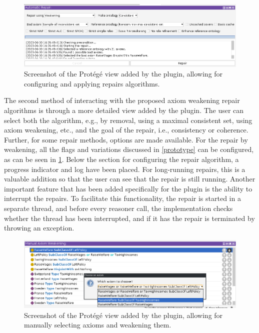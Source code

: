 \begin{figure}[ht]
  \centering
  \includegraphics[width=\textwidth]{resources/protege-repair.png}
  \caption{Screenshot of the Protégé view added by the plugin, allowing for configuring and applying repairs algorithms.}
  \label{fig:protege-repair}
\end{figure}

The second method of interacting with the proposed axiom weakening repair algorithms is through a more detailed view added by the plugin. The user can select both the algorithm, e.g., by removal, using a maximal consistent set, using axiom weakening, etc., and the goal of the repair, i.e., consistency or coherence. Further, for some repair methods, options are made available. For the repair by weakening, all the flags and variations discussed in \cref{prototype} can be configured, as can be seen in \cref{fig:protege-repair}. Below the section for configuring the repair algorithm, a progress indicator and log have been placed. For long-running repairs, this is a valuable addition so that the user can see that the repair is still running. Another important feature that has been added specifically for the plugin is the ability to interrupt the repairs. To facilitate this functionality, the repair is started in a separate thread, and before every reasoner call, the implementation checks whether the thread has been interrupted, and if it has the repair is terminated by throwing an exception.

\begin{figure}[ht]
  \centering
  \includegraphics[width=\textwidth]{resources/protege-manual.png}
  \caption{Screenshot of the Protégé view added by the plugin, allowing for manually selecting axioms and weakening them.}
  \label{fig:protege-manual}
\end{figure}

